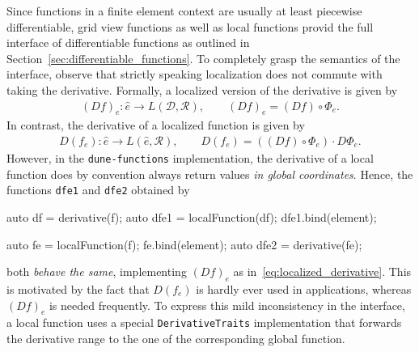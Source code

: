\documentclass[11pt,
                 numbers=noenddot,
                 headings=normal,
                 DIV16, BCOR10mm]{scrartcl}
\newcommand{\cpp}{\lstinline}
\theoremstyle{remark}
\newcommand{\dunemodule}[1]{\texttt{#1}}
\begin{document}
Since functions in a finite element context are usually at least piecewise
differentiable, grid view functions as well as local functions provid the full
interface of differentiable functions as outlined in Section~\ref{sec:differentiable_functions}.
To completely grasp the semantics of the interface, observe that strictly speaking localization does
not commute with taking the derivative. Formally, a localized version of the derivative is given by
\begin{align}
\label{eq:localized_derivative}
    (Df)_e : \hat{e} \to L(\mathcal{D}, \mathcal{R}), \qquad (Df)_e = (Df) \circ \Phi_e.
\end{align}
In contrast, the derivative of a localized function is given by
\begin{align*}
    D(f_e) : \hat{e} \to L(\hat{e}, \mathcal{R}), \qquad D(f_e) = ((Df) \circ \Phi_e) \cdot D \Phi_e.
\end{align*}
However, in the \dunemodule{dune-functions} implementation, the derivative of a local function
does by convention always return values {\em in global coordinates}. Hence, the functions
\cpp{dfe1} and \cpp{dfe2} obtained by
\begin{c++}
auto df = derivative(f);
auto dfe1 = localFunction(df);
dfe1.bind(element);

auto fe = localFunction(f);
fe.bind(element);
auto dfe2 = derivative(fe);
\end{c++}
both {\em behave the same}, implementing $(Df)_e$ as in~\eqref{eq:localized_derivative}.
This is motivated by the fact that $D(f_e)$ is
hardly ever used in applications, whereas $(Df)_e$ is needed
frequently. To express this mild inconsistency in the interface,
a local function uses a special \cpp{DerivativeTraits} implementation
that forwards the derivative range to the one of the corresponding
global function.
\end{document}
